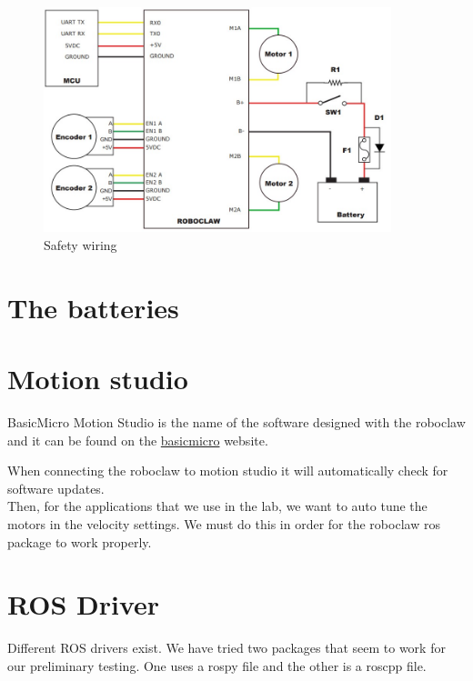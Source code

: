 \documentclass[12pt,letterpaper,oneside]{article}
\begin{document}
\newpage
\begin{figure}[h]
    \centering
    \includegraphics[width=0.9\textwidth]{figures/wiring.jpg}
    \caption{Safety wiring}
    \label{fig:my_label}
\end{figure}


\section{The batteries}


\section{Motion studio}

BasicMicro Motion Studio is the name of the software designed with the roboclaw and it can be found on the \href{https://www.basicmicro.com/downloads}{basicmicro} website.\par

When connecting the roboclaw to motion studio it will automatically check for software updates.\\
Then, for the applications that we use in the lab, we want to auto tune the motors in the velocity settings. We must do this in order for the roboclaw ros package to work properly.

\section{ROS Driver}

Different ROS drivers exist. We have tried two packages that seem to work for our preliminary testing. One uses a rospy file and the other is a roscpp file.
\end{document}

